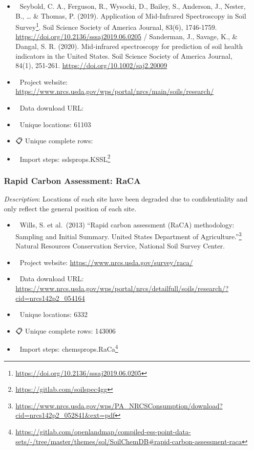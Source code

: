 \documentclass[
  graybox,natbib,nospthms]{svmono}
\providecommand{\tightlist}{%
  \setlength{\itemsep}{0pt}\setlength{\parskip}{0pt}}
\providecommand{\tightlist}{\setlength{\itemsep}{0pt}\setlength{\parskip}{0pt}}
\renewcommand{\href}[2]{#2 (\url{#1})}
\renewcommand{\href}[2]{#2\footnote{\url{#1}}}
\begin{document}
\begin{itemize}
\tightlist
\item
  📕 Seybold, C. A., Ferguson, R., Wysocki, D., Bailey, S., Anderson, J., Nester, B., \ldots{} \& Thomas, P. (2019). \href{https://doi.org/10.2136/sssaj2019.06.0205}{Application of Mid‐Infrared Spectroscopy in Soil Survey}. Soil Science Society of America Journal, 83(6), 1746-1759. \url{https://doi.org/10.2136/sssaj2019.06.0205} / Sanderman, J., Savage, K., \& Dangal, S. R. (2020). Mid‐infrared spectroscopy for prediction of soil health indicators in the United States. Soil Science Society of America Journal, 84(1), 251-261. \url{https://doi.org/10.1002/saj2.20009}\\
\item
  🔗 Project website: \url{https://www.nrcs.usda.gov/wps/portal/nrcs/main/soils/research/}\\
\item
  📂 Data download URL:\\
\item
  📍 Unique locations: 61103\\
\item
  📋 Unique complete rows:\\
\item
  📝 Import steps: \href{https://gitlab.com/soilspec4gg}{sslsprops.KSSL}
\end{itemize}

\hypertarget{rapid-carbon-assessment-raca}{%
\subsubsection{Rapid Carbon Assessment: RaCA}\label{rapid-carbon-assessment-raca}}

\emph{Description}: Locations of each site have been degraded due to confidentiality and
only reflect the general position of each site.

\begin{itemize}
\tightlist
\item
  📕 Wills, S. et al.~(2013) \href{https://www.nrcs.usda.gov/wps/PA_NRCSConsumption/download?cid=nrcs142p2_052841\&ext=pdf}{``Rapid carbon assessment (RaCA) methodology: Sampling and Initial Summary. United States Department of Agriculture.''} Natural Resources Conservation Service, National Soil Survey Center.\\
\item
  🔗 Project website: \url{https://www.nrcs.usda.gov/survey/raca/}\\
\item
  📂 Data download URL: \url{https://www.nrcs.usda.gov/wps/portal/nrcs/detailfull/soils/research/?cid=nrcs142p2_054164}\\
\item
  📍 Unique locations: 6332\\
\item
  📋 Unique complete rows: 143006\\
\item
  📝 Import steps: \href{https://gitlab.com/openlandmap/compiled-ess-point-data-sets/-/tree/master/themes/sol/SoilChemDB\#rapid-carbon-assessment-raca}{chemsprops.RaCa}
\end{itemize}
\end{document}

